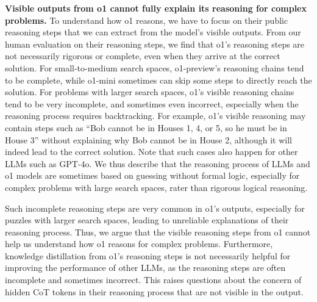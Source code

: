 
\textbf{Visible outputs from o1 cannot fully explain its reasoning for complex problems.}
To understand how o1 reasons, we have to focus on their public reasoning steps that we can extract from the model's visible outputs. 
From our human evaluation on their reasoning steps, we find that o1's reasoning steps are not necessarily rigorous or complete, even when they arrive at the correct solution.
For small-to-medium search spaces, o1-preview's reasoning chains tend to be complete, while o1-mini sometimes can skip some steps to directly reach the solution.
For problems with larger search spaces, o1's visible reasoning chains tend to be very incomplete, and sometimes even incorrect, especially when the reasoning process requires backtracking.
For example, o1's visible reasoning may contain steps such as ``Bob cannot be in Houses 1, 4, or 5, so he must be in House 3'' without explaining why Bob cannot be in House 2, although it will indeed lead to the correct solution. Note that such cases also happen for other LLMs such as GPT-4o. 
We thus describe that the reasoning process of LLMs and o1 models are sometimes based on guessing without formal logic, especially for complex problems with large search spaces, rater than rigorous logical reasoning.

Such incomplete reasoning steps are very common in o1's outputs, especially for puzzles with larger search spaces, leading to unreliable explanations of their reasoning process.
Thus, we argue that the visible reasoning steps from o1 cannot help us understand how o1 reasons for complex problems.
Furthermore, knowledge distillation from o1's reasoning steps is not necessarily helpful for improving the performance of other LLMs, as the reasoning steps are often incomplete and sometimes incorrect. This raises questions about the concern of hidden CoT tokens in their reasoning process that are not visible in the output.



